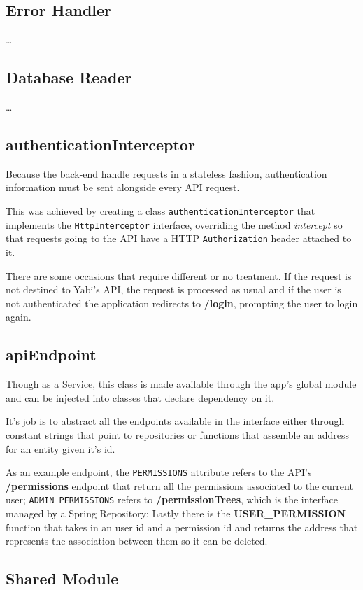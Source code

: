 \subsection{Error Handler}
\dots
\subsection{Database Reader}
\dots
\subsection{authenticationInterceptor}
Because the back-end handle requests in a stateless fashion, authentication information must be sent alongside every \gls{API} request.

This was achieved by creating a class \texttt{authenticationInterceptor} that implements the \texttt{HttpInterceptor} interface, overriding the method \textit{intercept} so that requests going to the \gls{API} have a \gls{HTTP} \texttt{Authorization} header attached to it.

There are some occasions that require different or no treatment. If the request is not destined to \gls{Yabi}'s \gls{API}, the request is processed as usual and if the user is not authenticated the application redirects to \textbf{/login}, prompting the user to login again.

\subsection{apiEndpoint}
Though as a Service, this class is made available through the app's global module and can be injected into classes that declare dependency on it.

It's job is to abstract all the endpoints available in the interface either through constant strings that point to repositories or functions that assemble an address for an entity given it's id.

As an example endpoint, the \texttt{PERMISSIONS} attribute refers to the \gls{API}'s \textbf{/permissions} endpoint that return all the permissions associated to the current user; \texttt{ADMIN_PERMISSIONS} refers to \textbf{/permissionTrees}, which is the interface managed by a Spring Repository; Lastly there is the \textbf{USER_PERMISSION} function that takes in an user id and a permission id and returns the address that represents the association between them so it can be deleted.

\subsection{Shared Module}


